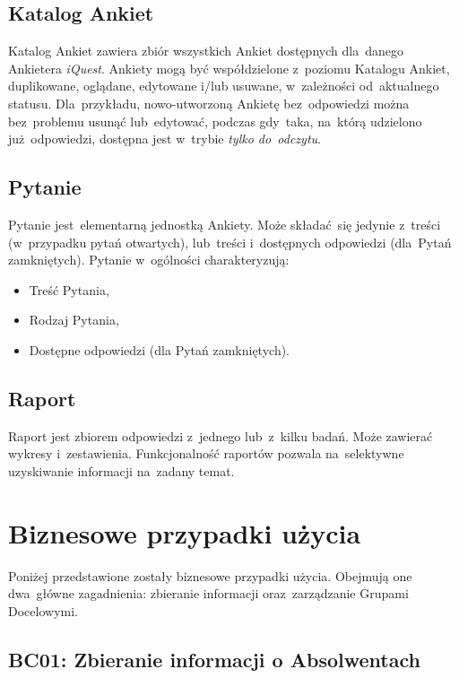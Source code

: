 \subsection{Katalog Ankiet}
\label{Chapter234}

Katalog Ankiet zawiera zbiór wszystkich Ankiet dostępnych dla~danego Ankietera \textit{iQuest}. Ankiety mogą być współdzielone z~poziomu Katalogu Ankiet, duplikowane, oglądane, edytowane i/lub usuwane, w~zależności od~aktualnego statusu. Dla~przykładu, nowo-utworzoną Ankietę bez~odpowiedzi można bez~problemu usunąć lub~edytować, podczas gdy~taka, na~którą udzielono już~odpowiedzi, dostępna jest w~trybie \textit{tylko do~odczytu}.

\subsection{Pytanie}
\label{Chapter235}

Pytanie jest~elementarną jednostką Ankiety. Może składać~się jedynie z~treści (w~przypadku pytań otwartych), lub~treści i~dostępnych odpowiedzi (dla~Pytań zamkniętych). Pytanie w~ogólności charakteryzują:

\begin{itemize}
\item Treść Pytania,
\item Rodzaj Pytania,
\item Dostępne odpowiedzi (dla Pytań zamkniętych).
\end{itemize}

\subsection{Raport}
\label{Chapter236}

Raport jest zbiorem odpowiedzi z~jednego lub~z~kilku badań. Może zawierać wykresy i~zestawienia. Funkcjonalność raportów pozwala na~selektywne uzyskiwanie informacji na~zadany temat.

\pagebreak
\section{Biznesowe przypadki użycia}
\label{Chapter24}

Poniżej przedstawione zostały biznesowe przypadki użycia. Obejmują one dwa~główne zagadnienia: zbieranie informacji oraz~zarządzanie Grupami Docelowymi.

\subsection{BC01: Zbieranie informacji o Absolwentach}
\label{Chapter241}

